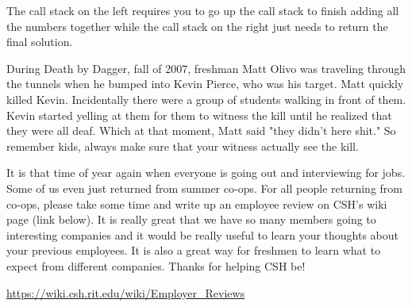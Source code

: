 \documentclass[9pt]{extarticle} %
\begin{document}
\begin{minipage}[t]{.66\linewidth}
The call stack on the left requires you to go up the call stack to finish
adding all the numbers together while the call stack on the right just
needs to return the final solution.


\hypertarget{secondnews}{} 

During Death by Dagger, fall of 2007, freshman Matt Olivo was traveling 
through the tunnels when he bumped into Kevin Pierce, who was his target.
Matt quickly killed Kevin. Incidentally there were a group of students walking
in front of them. Kevin started yelling at them for them to witness the kill
until he realized that they were all deaf. Which at that moment, Matt said 
"they didn't here shit." So remember kids, always make sure that your witness
actually see the kill.

\hypertarget{thirdnews}{} 

It is that time of year again when everyone is going out and interviewing for 
jobs. Some of us even just returned from summer co-ops. For all people returning from co-ops, please take some time and write up an employee review on CSH's 
wiki page (link below). It is really great that we have so many members going
to interesting companies and it would be really useful to learn your thoughts
about your previous employees. It is also a great way for freshmen to learn 
what to expect from different companies. Thanks for helping CSH be!
\centerline{\url{https://wiki.csh.rit.edu/wiki/Employer_Reviews}}

\end{minipage} %
\end{document}
